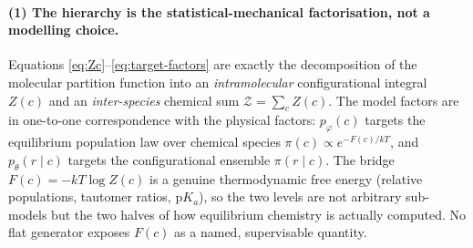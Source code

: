 \paragraph{(1) The hierarchy is the statistical-mechanical factorisation, not a modelling choice.}
\begin{proposition}
\label{prop:physics}
Equations \eqref{eq:Zc}--\eqref{eq:target-factors} are exactly the decomposition of the
molecular partition function into an \emph{intramolecular} configurational integral
$Z(c)$ and an \emph{inter-species} chemical sum $\mathcal{Z}=\sum_c Z(c)$. The model
factors are in one-to-one correspondence with the physical factors: $p_\varphi(c)$
targets the equilibrium population law over chemical species $\pi(c)\propto e^{-F(c)/kT}$,
and $p_\theta(r\mid c)$ targets the configurational ensemble $\pi(r\mid c)$. The bridge
$F(c)=-kT\log Z(c)$ is a genuine thermodynamic free energy (relative populations,
tautomer ratios, $\mathrm{p}K_a$), so the two levels are not arbitrary sub-models but the
two halves of how equilibrium chemistry is actually computed. No flat generator exposes
$F(c)$ as a named, supervisable quantity.
\end{proposition}

